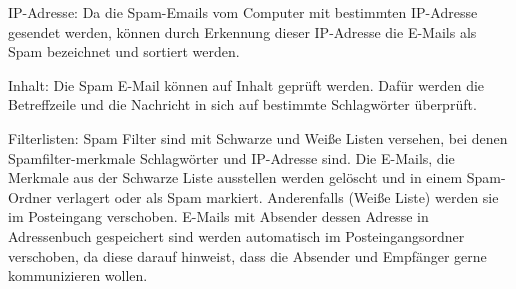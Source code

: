 IP-Adresse: Da die Spam-Emails vom Computer mit bestimmten IP-Adresse gesendet werden, können durch Erkennung dieser IP-Adresse die E-Mails als Spam bezeichnet und sortiert werden.

Inhalt: Die Spam E-Mail können auf Inhalt geprüft werden. Dafür werden die Betreffzeile und die Nachricht in sich auf bestimmte Schlagwörter überprüft.
 
Filterlisten: Spam Filter sind mit Schwarze und Weiße Listen versehen, bei denen Spamfilter-merkmale Schlagwörter und IP-Adresse sind. Die E-Mails, die Merkmale aus der Schwarze Liste ausstellen werden gelöscht und in einem Spam-Ordner verlagert oder als Spam markiert. Anderenfalls (Weiße Liste) werden sie im Posteingang verschoben. E-Mails mit Absender dessen Adresse in Adressenbuch gespeichert sind werden automatisch im Posteingangsordner verschoben, da diese darauf hinweist, dass die Absender und Empfänger gerne kommunizieren wollen.


